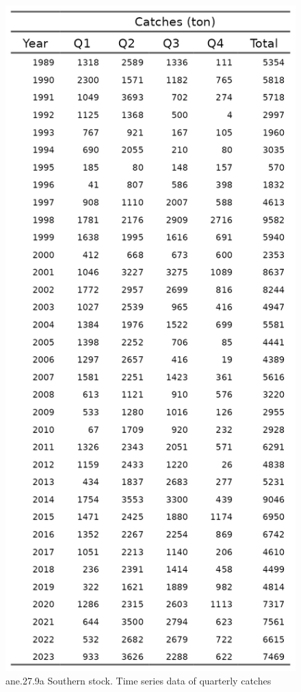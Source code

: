\documentclass[
]{article}
\begin{document}
\begin{figure}[H]

{\centering \includegraphics[width=0.95\linewidth]{report/run/S1.0_4FLEETS_SelECO_RecIndex_Mnewfix/tb_catches} 

}

\caption{ane.27.9a Southern stock. Time series data of quarterly catches }\label{fig:unnamed-chunk-30}
\end{figure}
\end{document}

